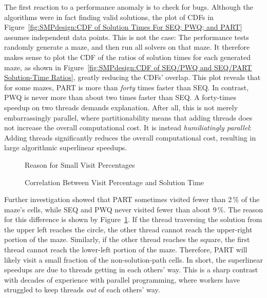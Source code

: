 The first reaction to a performance anomaly is to check for bugs.
Although the algorithms were in fact finding valid solutions, the
plot of CDFs in
Figure~\ref{fig:SMPdesign:CDF of Solution Times For SEQ; PWQ; and PART}
assumes independent data points.
This is not the case:  The performance tests randomly generate a maze,
and then run all solvers on that maze.
It therefore makes sense to plot the CDF of the ratios of
solution times for each generated maze,
as shown in
Figure~\ref{fig:SMPdesign:CDF of SEQ/PWQ and SEQ/PART Solution-Time Ratios},
greatly reducing the CDFs' overlap.
This plot reveals that for some mazes, PART
is more than \emph{forty} times faster than SEQ.
In contrast, PWQ is never more than about
two times faster than SEQ.
A forty-times speedup on two threads demands explanation.
After all, this is not merely embarrassingly parallel, where partitionability
means that adding threads does not increase the overall computational cost.
It is instead \emph{humiliatingly parallel}: Adding threads
significantly reduces the overall computational cost, resulting in
large algorithmic superlinear speedups.

\begin{figure}[tb]
\centering
{}
\caption{Reason for Small Visit Percentages}
\label{fig:SMPdesign:Reason for Small Visit Percentages}
\end{figure}

\begin{figure}[tb]
\centering
{}
\caption{Correlation Between Visit Percentage and Solution Time}
\label{fig:SMPdesign:Correlation Between Visit Percentage and Solution Time}
\end{figure}

Further investigation showed that
PART sometimes visited fewer than 2\,\% of the maze's cells,
while SEQ and PWQ never visited fewer than about 9\,\%.
The reason for this difference is shown by
Figure~\ref{fig:SMPdesign:Reason for Small Visit Percentages}.
If the thread traversing the solution from the upper left reaches
the circle, the other thread cannot reach
the upper-right portion of the maze.
Similarly, if the other thread reaches the square,
the first thread cannot reach the lower-left
portion of the maze.
Therefore, PART will likely visit a small fraction
of the non-solution-path cells.
In short, the superlinear speedups are due to threads getting in each
others' way.
This is a sharp contrast with decades of experience with
parallel programming, where workers have struggled
to keep threads \emph{out} of each others' way.

